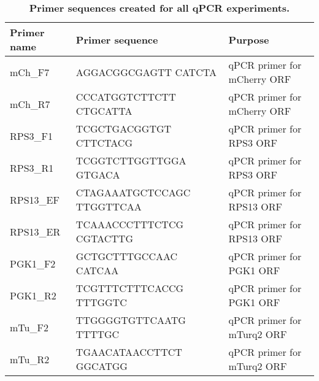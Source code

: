 \documentclass[../main.tex]{subfiles}
\begin{document}
\begin{table}[ph!]
\def\arraystretch{1.25}
\centering
\setlength{\tabcolsep}{5pt}\fontsize{9}{9}\selectfont
\begin{tabularx}{0.95\textwidth} { 
  | >{\centering\arraybackslash}X 
  | >{\centering\arraybackslash}X
  | >{\centering\arraybackslash}X | }
\hline
\textbf{Primer name} & \textbf{Primer sequence} & \textbf{Purpose}\\
\hline
mCh\_F7 & AGGACGGCGAGTT CATCTA & qPCR primer for mCherry ORF\\
\hline
mCh\_R7 & CCCATGGTCTTCTT CTGCATTA & qPCR primer for mCherry ORF\\
\hline
RPS3\_F1 & TCGCTGACGGTGT CTTCTACG & qPCR primer for RPS3 ORF\\
\hline
RPS3\_R1 & TCGGTCTTGGTTGGA GTGACA & qPCR primer for RPS3 ORF\\
\hline
RPS13\_EF & CTAGAAATGCTCCAGC TTGGTTCAA & qPCR primer for RPS13 ORF\\
\hline
RPS13\_ER & TCAAACCCTTTCTCG CGTACTTG & qPCR primer for RPS13 ORF\\
\hline
PGK1\_F2 & GCTGCTTTGCCAAC CATCAA & qPCR primer for PGK1 ORF\\
\hline
PGK1\_R2 & TCGTTTCTTTCACCG TTTGGTC & qPCR primer for PGK1 ORF\\
\hline
mTu\_F2 & TTGGGGTGTTCAATG TTTTGC & qPCR primer for mTurq2 ORF\\
\hline
mTu\_R2 & TGAACATAACCTTCT GGCATGG & qPCR primer for mTurq2 ORF\\
\hline
\end{tabularx}
\caption[Primer sequences created for all qPCR experiments.]{\label{tab:chimera-qpcr-primers-table}\textbf{Primer sequences created for all qPCR experiments.}}
\end{table}
\end{document}
